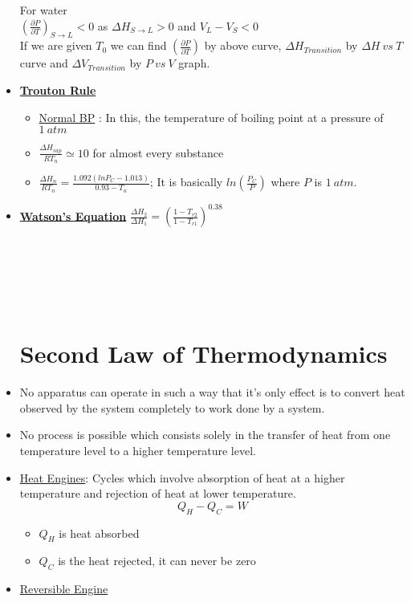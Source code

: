 \documentclass[12pt]{article}
\begin{document}
\begin{itemize}
\begin{tikzpicture}[x=0.75pt,y=0.75pt,yscale=-1,xscale=1]
\end{tikzpicture}
	For water \\
	$\displaystyle \left( \frac{\partial P}{\partial T}\right)_{S\to L}<0$ as $\Delta H_{S\to L} >0$ and $V_L-V_S <0$\\
	If we are given $T_0$ we can find $\displaystyle \left(\frac{\partial P}{\partial T}\right)$ by above curve, $\Delta H_{Transition}$ by $\Delta H\ vs\ T$ curve and $\Delta V_{Transition}$ by $P\ vs\ V$ graph.
	\item \textbf{\underline{ Trouton Rule}}
	\begin{itemize}
	\item \underline{Normal BP} : In this, the temperature of boiling point at a pressure of $1\ atm$
	\item $\displaystyle \frac{\Delta H_{vap}}{RT_n} \simeq 10$ for almost every substance
	\item $\displaystyle \frac{\Delta H_n}{RT_n}= \frac{1.092(lnP_C-1.013)}{0.93-T_n}$; It is basically $\displaystyle ln\left(\frac{P_C}{P}\right)$ where $P$ is $1\ atm$.
	\end {itemize}
	\item \textbf{\underline{ Watson's Equation}}
	$\displaystyle \frac{\Delta H_2}{\Delta H_1} = \left(\frac{1-T_{r2}}{1-T_{r1}}\right)^{0.38}$\\
	\\\\\\\\\\
	
	\section{ Second Law of Thermodynamics}
	\item No apparatus can operate in such a way that it's only effect is to convert heat observed by the system completely to work done by a system.
	\item No process is possible which consists solely in the transfer of heat from one temperature level to a higher temperature level.
	\item \underline{ Heat Engines}: Cycles  which involve absorption of heat at a higher temperature and rejection of heat at lower temperature.
	\[ Q_H-Q_C=W\]
	\begin{itemize}
	\item $Q_H$ is heat absorbed
	\item $Q_C$ is the heat rejected, it can never be zero
	\end{itemize}
	\item \underline{ Reversible Engine}
	


\end{itemize}
\end{document}
